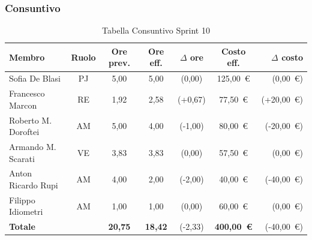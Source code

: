 \subsubsection{Consuntivo}
\begin{table}[H]
    \centering
    \renewcommand{\arraystretch}{1.3}
    \begin{tabularx}{\textwidth}{|X|c|c|c|c|c|r|}
        \hline
        \textbf{Membro} & \textbf{Ruolo} & \textbf{Ore prev.} &
        \textbf{Ore eff.} & \textbf{$\Delta$ ore} &
        \textbf{Costo eff.} & \textbf{$\Delta$ costo} \\
        \hline
        Sofia De Blasi       & PJ & 5,00 & 5,00 & {\color{green}(0,00)}  & 125{,}00~\euro & {\color{green}(0{,}00~\euro)} \\
        Francesco Marcon     & RE & 1,92 & 2,58 & {\color{red}(+0,67)} & 77{,}50~\euro  & {\color{red}(+20{,}00~\euro)} \\
        Roberto M. Doroftei  & AM & 5,00 & 4,00 & {\color{green}(-1,00)} & 80{,}00~\euro  & {\color{green}(-20{,}00~\euro)} \\
        Armando M. Scarati   & VE & 3,83 & 3,83 & {\color{green}(0,00)}  & 57{,}50~\euro  & {\color{green}(0{,}00~\euro)} \\
        Anton Ricardo Rupi   & AM & 4,00 & 2,00 & {\color{green}(-2,00)}  & 40{,}00~\euro & {\color{green}(-40{,}00~\euro)} \\
        Filippo Idiometri    & AM & 1,00 & 1,00 & {\color{green}(0,00)} & 60{,}00~\euro  & {\color{green}(0{,}00~\euro)} \\
        \hline
        \textbf{Totale} & & \textbf{20,75} & \textbf{18,42} & {\color{green}(-2,33)} & \textbf{400{,}00~\euro} & {\color{green}(-40{,}00~\euro)} \\
        \hline
    \end{tabularx}
    \caption{Tabella Consuntivo Sprint 10}
\end{table}

